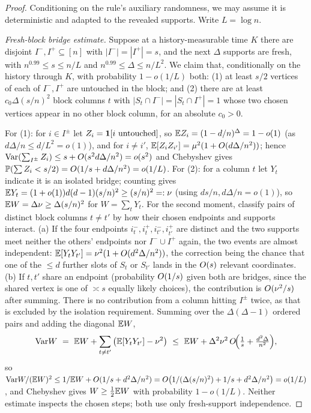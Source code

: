 \begin{proof}
Conditioning on the rule's auxiliary randomness, we may assume it is deterministic and adapted to the revealed supports.
Write $L=\log n$.

\emph{Fresh-block bridge estimate.} Suppose at a history-measurable time $K$ there are disjoint $I^-,I^+\subseteq[n]$ with
$|I^-|=|I^+|=s$, and the next $\Delta$ supports are fresh, with $n^{0.99}\le s\le n/L$ and $n^{0.99}\le\Delta\le n/L^2$.
We claim that, conditionally on the history through $K$, with probability $1-o(1/L)$ both: (1) at least $s/2$ vertices of each
of $I^-,I^+$ are untouched in the block; and (2) there are at least $c_0\Delta(s/n)^2$ block columns $t$ with
$|S_t\cap I^-|=|S_t\cap I^+|=1$ whose two chosen vertices appear in no other block column, for an absolute $c_0>0$.

For (1): for $i\in I^\pm$ let $Z_i=\mathbf{1}[i\text{ untouched}]$, so $\mathbb{E} Z_i=(1-d/n)^\Delta=1-o(1)$ (as $d\Delta/n\le d/L^2=o(1)$),
and for $i\ne i'$, $\mathbb{E}[Z_iZ_{i'}]=\mu^2(1+O(d\Delta/n^2))$; hence $\mathrm{Var}(\sum_{I^\pm}Z_i)\le s+O(s^2 d\Delta/n^2)=o(s^2)$
and Chebyshev gives $\mathbb{P}(\sum Z_i<s/2)=O(1/s+d\Delta/n^2)=o(1/L)$. For (2): for a column $t$ let $Y_t$ indicate it is an
isolated bridge; counting gives $\mathbb{E} Y_t=(1+o(1))d(d-1)(s/n)^2\ge(s/n)^2=:\nu$ (using $ds/n,d\Delta/n=o(1)$), so $\mathbb{E} W=\Delta\nu\ge\Delta(s/n)^2$
for $W=\sum_t Y_t$. For the second moment, classify pairs of distinct block columns $t\ne t'$ by how their chosen endpoints
and supports interact. (a) If the four endpoints $i_t^-,i_t^+,i_{t'}^-,i_{t'}^+$ are distinct and the two supports meet
neither the others' endpoints nor $I^-\cup I^+$ again, the two events are almost independent: $\mathbb{E}[Y_tY_{t'}]=\nu^2(1+O(d^2\Delta/n^2))$,
the correction being the chance that one of the $\le d$ further slots of $S_t$ or $S_{t'}$ lands in the $O(s)$ relevant
coordinates. (b) If $t,t'$ share an endpoint (probability $O(1/s)$ given both are bridges, since the shared vertex is one of
$\asymp s$ equally likely choices), the contribution is $O(\nu^2/s)$ after summing. There is no contribution from a column
hitting $I^\pm$ twice, as that is excluded by the isolation requirement. Summing over the $\Delta(\Delta-1)$ ordered pairs and
adding the diagonal $\mathbb{E} W$,
\[
  \mathrm{Var} W\ =\ \mathbb{E} W+\sum_{t\ne t'}\big(\mathbb{E}[Y_tY_{t'}]-\nu^2\big)\ \le\ \mathbb{E} W+\Delta^2\nu^2\,O\!\Big(\tfrac1s+\tfrac{d^2\Delta}{n^2}\Big),
\]
so $\mathrm{Var} W/(\mathbb{E} W)^2\le 1/\mathbb{E} W+O(1/s+d^2\Delta/n^2)=O\big(1/(\Delta(s/n)^2)+1/s+d^2\Delta/n^2\big)=o(1/L)$, and Chebyshev
gives $W\ge\tfrac12\mathbb{E} W$ with probability $1-o(1/L)$. Neither estimate inspects the chosen steps; both use only fresh-support
independence.


\end{proof}
